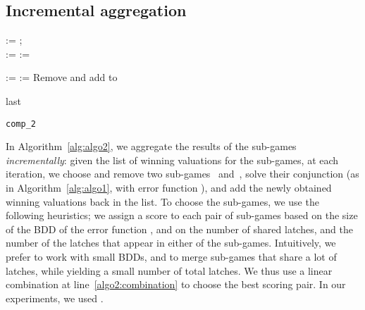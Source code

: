 \documentclass[submission,copyright,creativecommons]{eptcs}
\begin{document}
\subsection{Incremental aggregation}
\begin{algorithm}
	\small
	 := ;
	\\
	\For{}
	{
		 := \;
                \label{alg2-loc:endofloop}
	}
	 := \;
	\While{}
	{
		
		\label{algo2:combination}

		\lFor{}
		{
			 := 
		}
		 := \;
		\label{line:algo2:solve}
		Remove  and add  to \;
		\label{line:addrs}
	}
	\Return last \;
\caption{\texttt{comp\_2}}
\label{alg:algo2}
\end{algorithm}
In Algorithm~\ref{alg:algo2}, we aggregate the results of the sub-games
\emph{incrementally}: given the list of winning valuations  for the
sub-games, at each iteration, we choose and remove two sub-games~ and~,
solve their conjunction (as in Algorithm~\ref{alg:algo1}, with error function
), and add the newly obtained winning valuations back in
the list. 
To choose the sub-games, we use the following heuristics; we assign a score to
each pair of sub-games based on the size of the BDD of the error function , and on the number of shared latches, and the number
of the latches that appear in either of the sub-games.  Intuitively, we prefer
to work with small BDDs, and to merge sub-games that share a lot of latches,
while yielding a small number of total latches.  We thus use a linear
combination at line~\ref{algo2:combination} to choose the best scoring pair. In
our experiments, we used .
\end{document}
